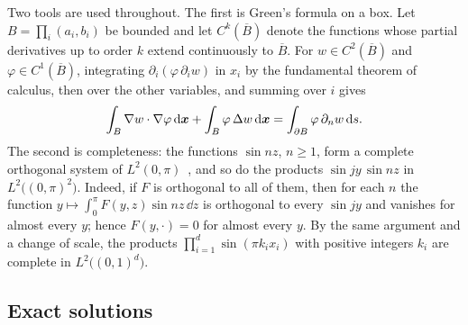 Two tools are used throughout. The first is Green's formula on a box. Let
$B=\prod_{i}(a_i,b_i)$ be bounded and let $C^k(\overline B)$ denote the functions whose
partial derivatives up to order $k$ extend continuously to $\overline B$. For
$w\in C^2(\overline B)$ and $\varphi\in C^1(\overline B)$, integrating
$\partial_i(\varphi\,\partial_i w)$ in $x_i$ by the fundamental theorem of calculus, then
over the other variables, and summing over $i$ gives
\begin{equation}\label{sA_proofs:eq:green}
\int_B\nabla w\cdot\nabla\varphi\,\mathrm{d}\boldsymbol{x}+\int_B\varphi\,\Delta w\,\mathrm{d}\boldsymbol{x}
=\int_{\partial B}\varphi\,\partial_n w\,\mathrm{d} s .
\end{equation}
The second is completeness: the functions $\sin nz$, $n\ge1$, form a complete orthogonal
system of $L^2(0,\pi)$~\citep[Sec.~5.4]{strauss2008}, and so do the products
$\sin jy\,\sin nz$ in $L^2\bigl((0,\pi)^2\bigr)$. Indeed, if $F$ is orthogonal to all of
them, then for each $n$ the function $y\mapsto\int_0^\pi F(y,z)\sin nz\,\dd z$ is
orthogonal to every $\sin jy$ and vanishes for almost every $y$; hence $F(y,\cdot)=0$ for
almost every $y$. By the same argument and a change of scale, the products
$\prod_{i=1}^d\sin(\pi k_ix_i)$ with positive integers $k_i$ are complete in
$L^2\bigl((0,1)^d\bigr)$.

\subsection{Exact solutions}\label{sA_proofs:sec:exact}

